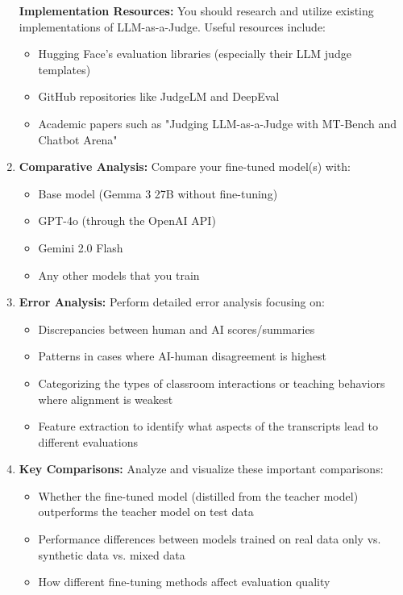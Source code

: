 \documentclass[11pt]{article}
\begin{document}
\begin{enumerate}
    \textbf{Implementation Resources:} You should research and utilize existing implementations of LLM-as-a-Judge. Useful resources include:
    \begin{itemize}
        \item Hugging Face's evaluation libraries (especially their LLM judge templates)
        \item GitHub repositories like JudgeLM and DeepEval
        \item Academic papers such as "Judging LLM-as-a-Judge with MT-Bench and Chatbot Arena"
    \end{itemize}
    
    \item \textbf{Comparative Analysis:} Compare your fine-tuned model(s) with:
    \begin{itemize}
        \item Base model (Gemma 3 27B without fine-tuning)
        \item GPT-4o (through the OpenAI API)
        \item Gemini 2.0 Flash
        \item Any other models that you train
    \end{itemize}
    
    \item \textbf{Error Analysis:} Perform detailed error analysis focusing on:
    \begin{itemize}
        \item Discrepancies between human and AI scores/summaries
        \item Patterns in cases where AI-human disagreement is highest
        \item Categorizing the types of classroom interactions or teaching behaviors where alignment is weakest
        \item Feature extraction to identify what aspects of the transcripts lead to different evaluations
    \end{itemize}
    
    \item \textbf{Key Comparisons:} Analyze and visualize these important comparisons:
    \begin{itemize}
        \item Whether the fine-tuned model (distilled from the teacher model) outperforms the teacher model on test data
        \item Performance differences between models trained on real data only vs. synthetic data vs. mixed data
        \item How different fine-tuning methods affect evaluation quality
    \end{itemize}
\end{enumerate}
\end{document}
